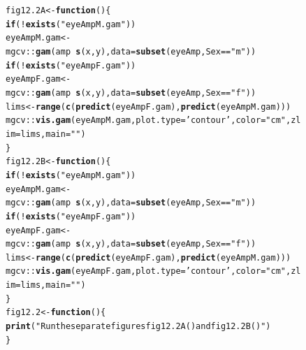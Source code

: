 \documentclass[12pt, a4paper,  BCOR=8.25mm, DIV=15]{scrartcl}\usepackage[]{graphicx}\usepackage[]{color}
\makeatletter
\newcommand{\hlstr}[1]{\textcolor[rgb]{0.192,0.494,0.8}{#1}}%
\newcommand{\hlopt}[1]{\textcolor[rgb]{0,0,0}{#1}}%
\newcommand{\hlstd}[1]{\textcolor[rgb]{0.345,0.345,0.345}{#1}}%
\newcommand{\hlkwa}[1]{\textcolor[rgb]{0.161,0.373,0.58}{\textbf{#1}}}%
\newcommand{\hlkwb}[1]{\textcolor[rgb]{0.69,0.353,0.396}{#1}}%
\newcommand{\hlkwc}[1]{\textcolor[rgb]{0.333,0.667,0.333}{#1}}%
\newcommand{\hlkwd}[1]{\textcolor[rgb]{0.737,0.353,0.396}{\textbf{#1}}}%
\newenvironment{kframe}{%
 \def\at@end@of@kframe{}%
 \ifinner\ifhmode%
  \def\at@end@of@kframe{\end{minipage}}%
  \begin{minipage}{\columnwidth}%
 \fi\fi%
 \def\FrameCommand##1{\hskip\@totalleftmargin \hskip-\fboxsep
 \colorbox{shadecolor}{##1}\hskip-\fboxsep
     \hskip-\linewidth \hskip-\@totalleftmargin \hskip\columnwidth}%
 \MakeFramed {\advance\hsize-\width
   \@totalleftmargin\z@ \linewidth\hsize
   \@setminipage}}%
 {\par\unskip\endMakeFramed%
 \at@end@of@kframe}
\newenvironment{knitrout}{}{} %
\makeatother
\begin{document}
\begin{figure}
\begin{knitrout}
\color{fgcolor}\begin{kframe}
\begin{alltt}
\hlstd{fig12.2A} \hlkwb{<-} \hlkwa{function}\hlstd{()\{}
    \hlkwa{if}\hlstd{(}\hlopt{!}\hlkwd{exists}\hlstd{(}\hlstr{"eyeAmpM.gam"}\hlstd{))}
\hlstd{eyeAmpM.gam} \hlkwb{<-} \hlstd{mgcv}\hlopt{::}\hlkwd{gam}\hlstd{(amp} \hlopt{~} \hlkwd{s}\hlstd{(x,y),} \hlkwc{data}\hlstd{=}\hlkwd{subset}\hlstd{(eyeAmp, Sex}\hlopt{==}\hlstr{"m"}\hlstd{))}
        \hlkwa{if}\hlstd{(}\hlopt{!}\hlkwd{exists}\hlstd{(}\hlstr{"eyeAmpF.gam"}\hlstd{))}
\hlstd{eyeAmpF.gam} \hlkwb{<-} \hlstd{mgcv}\hlopt{::}\hlkwd{gam}\hlstd{(amp} \hlopt{~} \hlkwd{s}\hlstd{(x,y),} \hlkwc{data}\hlstd{=}\hlkwd{subset}\hlstd{(eyeAmp, Sex}\hlopt{==}\hlstr{"f"}\hlstd{))}
\hlstd{lims} \hlkwb{<-} \hlkwd{range}\hlstd{(}\hlkwd{c}\hlstd{(}\hlkwd{predict}\hlstd{(eyeAmpF.gam),} \hlkwd{predict}\hlstd{(eyeAmpM.gam)))}
\hlstd{mgcv}\hlopt{::}\hlkwd{vis.gam}\hlstd{(eyeAmpM.gam,} \hlkwc{plot.type}\hlstd{=}\hlstr{'contour'}\hlstd{,} \hlkwc{color}\hlstd{=}\hlstr{"cm"}\hlstd{,} \hlkwc{zlim}\hlstd{=lims,} \hlkwc{main}\hlstd{=}\hlstr{""}\hlstd{)}
\hlstd{\}}
\hlstd{fig12.2B} \hlkwb{<-} \hlkwa{function}\hlstd{()\{}
    \hlkwa{if}\hlstd{(}\hlopt{!}\hlkwd{exists}\hlstd{(}\hlstr{"eyeAmpM.gam"}\hlstd{))}
    \hlstd{eyeAmpM.gam} \hlkwb{<-} \hlstd{mgcv}\hlopt{::}\hlkwd{gam}\hlstd{(amp} \hlopt{~} \hlkwd{s}\hlstd{(x,y),} \hlkwc{data}\hlstd{=}\hlkwd{subset}\hlstd{(eyeAmp, Sex}\hlopt{==}\hlstr{"m"}\hlstd{))}
    \hlkwa{if}\hlstd{(}\hlopt{!}\hlkwd{exists}\hlstd{(}\hlstr{"eyeAmpF.gam"}\hlstd{))}
    \hlstd{eyeAmpF.gam} \hlkwb{<-} \hlstd{mgcv}\hlopt{::}\hlkwd{gam}\hlstd{(amp} \hlopt{~} \hlkwd{s}\hlstd{(x,y),} \hlkwc{data}\hlstd{=}\hlkwd{subset}\hlstd{(eyeAmp, Sex}\hlopt{==}\hlstr{"f"}\hlstd{))}
\hlstd{lims} \hlkwb{<-} \hlkwd{range}\hlstd{(}\hlkwd{c}\hlstd{(}\hlkwd{predict}\hlstd{(eyeAmpF.gam),} \hlkwd{predict}\hlstd{(eyeAmpM.gam)))}
\hlstd{mgcv}\hlopt{::}\hlkwd{vis.gam}\hlstd{(eyeAmpF.gam,} \hlkwc{plot.type}\hlstd{=}\hlstr{'contour'}\hlstd{,} \hlkwc{color}\hlstd{=}\hlstr{"cm"}\hlstd{,} \hlkwc{zlim}\hlstd{=lims,} \hlkwc{main}\hlstd{=}\hlstr{""}\hlstd{)}
\hlstd{\}}
\hlstd{fig12.2} \hlkwb{<-} \hlkwa{function}\hlstd{()\{}
\hlkwd{print}\hlstd{(}\hlstr{"Run the separate figures fig12.2A() and fig12.2B()"}\hlstd{)}
\hlstd{\}}
\end{alltt}
\end{kframe}
\end{knitrout}
\end{figure}
\end{document}
